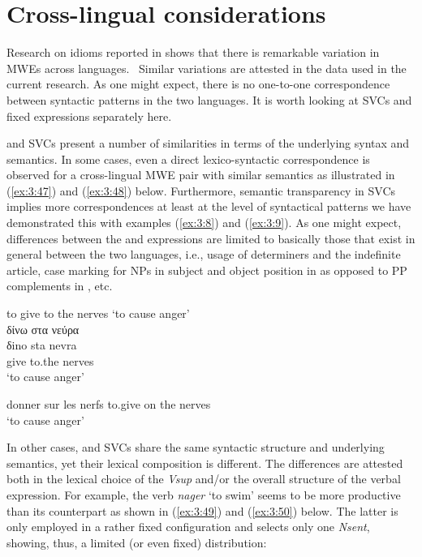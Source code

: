 \documentclass[output=paper]{langsci/langscibook}
\begin{document}
\section{Cross-lingual considerations}

Research on idioms reported in \cite{villavicencio2004} shows that
there is remarkable variation in MWEs across languages. \ Similar
variations are attested in the data used in the current research. As
one might expect, there is no one-to-one correspondence between
syntactic patterns in the two languages. It is worth looking at SVCs
and fixed expressions separately here.



 and  SVCs present a number of similarities in terms of the
underlying syntax and semantics. In some cases, even a direct
lexico-syntactic correspondence is observed for a cross-lingual MWE
pair with similar semantics as illustrated in (\ref{ex:3:47}) and (\ref{ex:3:48}) below.
Furthermore, semantic transparency in SVCs implies more correspondences
at least at the level of syntactical patterns \textendash{} we have demonstrated this with examples (\ref{ex:3:8}) and
(\ref{ex:3:9}). As one might expect, differences between the  and 
expressions are limited to basically those that exist in general
between the two languages, i.e., usage of determiners and the
indefinite article, case marking for NPs in subject and object position
in  as opposed to PP complements in , etc.

\begin{exe}
\ex \label{ex:3:47}
to give to the nerves `to cause anger'\\
\glll δίνω στα νεύρα \\
δino sta nevra\\
give to.the nerves\\
\glt %
‘to cause anger’
\end{exe}

\begin{exe}
\ex \label{ex:3:48} donner sur les nerfs
\glt to.give on the nerves\\
‘to cause anger’
\end{exe}



In other cases,  and  SVCs share the same syntactic structure and
underlying semantics, yet their lexical composition is different. The
differences are attested both in the lexical choice of the
\textit{Vsup} and/or the overall structure of the verbal expression.
For example, the  verb \textit{nager} ‘to swim’ seems to
be more productive than its  counterpart 
 as
shown in (\ref{ex:3:49}) and (\ref{ex:3:50}) below. The latter is only employed in a rather
fixed configuration and selects only one \textit{Nsent}, showing, thus,
a limited (or even fixed) distribution: 
\end{document}
